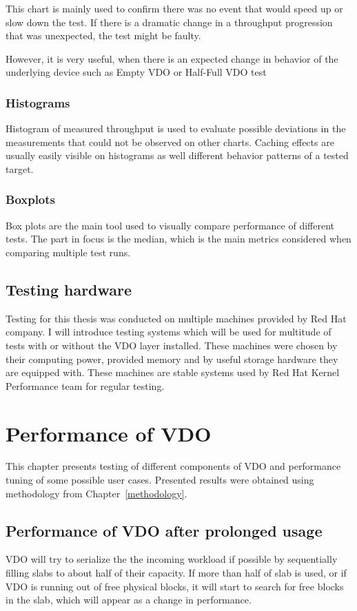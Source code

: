 \documentclass[
  color, %
  table, %
  lof,   %
  lot,   %
]{fithesis3}
\begin{document}

This chart is mainly used to confirm there was no event that would speed up or slow down the test. If there is a dramatic change in a throughput progression that was unexpected, the test might be faulty.

However, it is very useful, when there is an expected change in behavior of the underlying device such as Empty VDO or Half-Full VDO test

\subsection{Histograms}
Histogram of measured throughput is used to evaluate possible deviations in the measurements that could not be observed on other charts. Caching effects are usually easily visible on histograms as well different behavior patterns of a tested target.

\subsection{Boxplots}
Box plots are the main tool used to visually compare performance of different tests. The part in focus is the median, which is the main metrics considered when comparing multiple test runs.

\section{Testing hardware}
Testing for this thesis was conducted on multiple machines provided by Red Hat company. I will introduce testing systems which will be used for multitude of tests with or without the VDO layer installed. These machines were chosen by their computing power, provided memory and by useful storage hardware they are equipped with. These machines are stable systems used by Red Hat Kernel Performance team for regular testing.



\chapter{Performance of VDO}
\label{testing}
This chapter presents testing of different components of VDO and performance tuning of some possible user cases. Presented results were obtained using methodology from Chapter~\ref{methodology}.

\section{Performance of VDO after prolonged usage}
\label{half}
VDO will try to serialize the the incoming workload if possible by sequentially filling slabs to about half of their capacity. If more than half of slab is used, or if VDO is running out of free physical blocks, it will start to search for free blocks in the slab, which will appear as a change in performance. 
\end{document}
